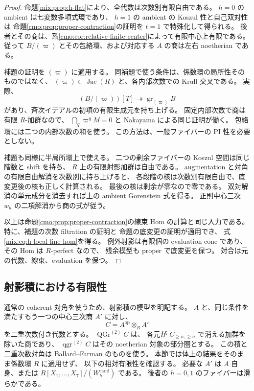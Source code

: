 \begin{proof}
命題\ref{mix:prop:h-flat}により、全代数は次数別有限自由である。
$h=0$ の ambient は七変数多項式環であり、
$h=1$ の ambient の Koszul 性と自己双対性は
命題\ref{cmo:prop:proper-contraction}の証明を $t=1$ で特殊化して得られる。
後者とその商は、系\ref{cmo:cor:relative-finite-center}によって有限中心上有限である。
従って $B/(\varpi)$ とその包絡環、および対応する $A$ の商は左右 noetherian である。

補題の証明を $(\varpi)$ に適用する。
同補題で使う条件は、係数環の局所性そのものではなく、
$(\varpi)\subset\operatorname{Jac}(R)$ と、各内部次数での Krull 交叉である。
実際、
\[
 (B/(\varpi))[T]\twoheadrightarrow\operatorname{gr}_{(\varpi)}B
\]
があり、斉次イデアルの初項の有限生成元を持ち上げる。
固定内部次数で商は有限 $R$-加群なので、
$\bigcap_q\varpi^qM=0$ と Nakayama による同じ証明が働く。
包絡環には二つの内部次数の和を使う。
この方法は、一般ファイバーの PI 性を必要としない。

補題も同様に半局所環上で使える。
二つの剰余ファイバーの Koszul 空間は同じ階数と shift を持ち、
$R$ 上の有限射影加群は自由である。
augmentation と対角の有限自由解消を次数別に持ち上げると、
各段階の核は次数別有限自由で、底変更後の核も正しく計算される。
最後の核は剰余が零なので零である。
双対解消の単元成分を消去すれば上の ambient Gorenstein 式を得る。
正則中心三次 $w_h$ の二項解消から商の式が従う。

以上は命題\ref{cmo:prop:proper-contraction}の線束 Hom の計算と同じ入力である。
特に、補題の次数 filtration の証明と
命題の底変更の証明が適用でき、
式\eqref{mix:eq:h-local-line-hom}を得る。
例外射影は有限個の evaluation cone であり、その Hom は $R$-perfect なので、
残余模型も proper で底変更を保つ。
対合は元の代数、線束、evaluation を保つ。
\end{proof}

\subsection{射影積における有限性}

通常の coherent 対角を使うため、射影積の模型を明記する。
$A$ と、同じ条件を満たすもう一つの中心三次商 $A'$ に対し、
\[
 C=A^{\mathrm{op}}\otimes_RA'
\]
を二重次数付き代数とする。
$\operatorname{QGr}^{(2)}C$ は、
各元が $C_{\ge n,\ge n}$ で消える加群を除いた商であり、
$\operatorname{qgr}^{(2)}C$ はその noetherian 対象の部分圏とする。
この積と二重次数対角は
Ballard--Farman \cite[Definitions~3.16, 3.18, Section~3.4]{CMOBallardFarman}
のものを使う。
本節では体上の結果をそのまま係数環 $R$ に適用せず、
以下の相対有限性を確認する。
必要な $A'$ は $A$ 自身、または
$R[X_1,\ldots,X_7]/(W_h^{\mathrm{cand}})$ である。
後者の $h=0,1$ のファイバーは滑らかである。

